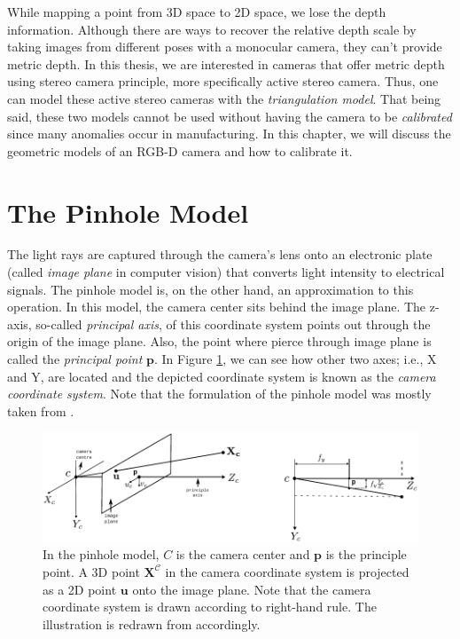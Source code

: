 \documentclass[a4paper]{report}
\numberwithin{figure}{section}
\begin{document}
While mapping a point from 3D space to 2D space, we lose the 
depth information.  Although there are ways to recover the relative depth 
scale by 
taking images from different poses with a monocular camera, they can't provide 
metric depth.  In this thesis, we are interested in cameras that offer metric 
depth using stereo camera principle, more specifically active stereo camera. 
Thus, one 
can 
model these active stereo cameras with the \textit{triangulation model}. That 
being said, these two models cannot be used without having the camera to be 
\textit{calibrated} since many anomalies occur in manufacturing. In this 
chapter, we will discuss the geometric models of an RGB-D camera and how 
to calibrate it.


\section{The Pinhole Model} \label{sc_pinhole}

The light rays are captured through the camera's lens onto an electronic plate 
(called \textit{image plane} in computer vision) that converts light intensity 
to electrical signals.  The pinhole model is, on the other hand, an 
approximation to this operation.  In this model, the camera 
center sits behind the image plane.  The z-axis, so-called \textit{principal 
axis}, of this coordinate system points out through the origin of the image 
plane. Also, the point where pierce through image plane is called the 
\textit{principal point} $\mathbf{p}$. In Figure \ref{fig:pinhole}, we can see 
how other two axes; 
i.e., X and Y, are located and the depicted coordinate system is known as 
the \textit{camera coordinate system}. Note that the formulation of the 
pinhole model was mostly taken from \parencite{RichardHartley2003}.


\begin{figure}[H]
	\centering
	\includegraphics[width=\linewidth,natwidth=640,natheight=640]
  {fig/drawings/pinhole_3d2d.pdf}
  \caption[The Pinhole Model]{In the pinhole model, $C$ is the camera center 
  and $\mathbf{p}$ is the principle point. A 3D point 
  $\mathbf{X^{\mathcal{C}}}$ in the 
  camera coordinate system is projected as a 2D point $\mathbf{u}$ onto the 
  image plane. Note that the camera coordinate system is drawn according to 
  right-hand rule. The illustration is redrawn from 
  \parencite{RichardHartley2003} 
  accordingly.}
	\label{fig:pinhole}
\end{figure}
\end{document}
